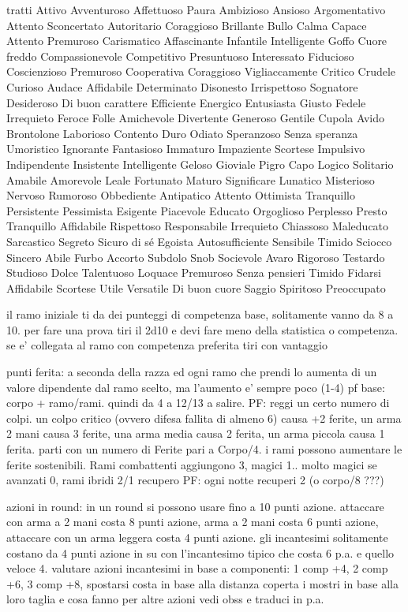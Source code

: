 \documentclass[12pt,a4paper,twoside,openany,twocolumn]{book}
\begin{document}
tratti
Attivo
Avventuroso
Affettuoso
Paura
Ambizioso
Ansioso
Argomentativo
Attento
Sconcertato
Autoritario
Coraggioso
Brillante
Bullo
Calma
Capace
Attento
Premuroso
Carismatico
Affascinante
Infantile
Intelligente
Goffo
Cuore freddo
Compassionevole
Competitivo
Presuntuoso
Interessato
Fiducioso
Coscienzioso
Premuroso
Cooperativa
Coraggioso
Vigliaccamente
Critico
Crudele
Curioso
Audace
Affidabile
Determinato
Disonesto
Irrispettoso
Sognatore
Desideroso
Di buon carattere
Efficiente
Energico
Entusiasta
Giusto
Fedele
Irrequieto
Feroce
Folle
Amichevole
Divertente
Generoso
Gentile
Cupola
Avido
Brontolone
Laborioso
Contento
Duro
Odiato
Speranzoso
Senza speranza
Umoristico
Ignorante
Fantasioso
Immaturo
Impaziente
Scortese
Impulsivo
Indipendente
Insistente
Intelligente
Geloso
Gioviale
Pigro
Capo
Logico
Solitario
Amabile
Amorevole
Leale
Fortunato
Maturo
Significare
Lunatico
Misterioso
Nervoso
Rumoroso
Obbediente
Antipatico
Attento
Ottimista
Tranquillo
Persistente
Pessimista
Esigente
Piacevole
Educato
Orgoglioso
Perplesso
Presto
Tranquillo
Affidabile
Rispettoso
Responsabile
Irrequieto
Chiassoso
Maleducato
Sarcastico
Segreto
Sicuro di sé
Egoista
Autosufficiente
Sensibile
Timido
Sciocco
Sincero
Abile
Furbo
Accorto
Subdolo
Snob
Socievole
Avaro
Rigoroso
Testardo
Studioso
Dolce
Talentuoso
Loquace
Premuroso
Senza pensieri
Timido
Fidarsi
Affidabile
Scortese
Utile
Versatile
Di buon cuore
Saggio
Spiritoso
Preoccupato


il ramo iniziale ti da dei punteggi di competenza base, solitamente vanno da 8 a 10.
per fare una prova tiri il 2d10 e devi fare meno della statistica o competenza. se e' collegata al ramo con competenza preferita tiri con vantaggio

punti ferita: a seconda della razza ed ogni ramo che prendi lo aumenta di un valore dipendente dal ramo scelto, ma l'aumento e' sempre poco (1-4)
pf base: corpo + ramo/rami. quindi da 4 a 12/13 a salire. 
PF:  reggi un certo numero di colpi. un colpo critico (ovvero difesa fallita di almeno 6) causa +2 ferite, un arma 2 mani causa 3 ferite, una arma media causa 2 ferita, un arma piccola causa 1 ferita.
parti con un numero di Ferite pari a Corpo/4. i rami possono aumentare le ferite sostenibili. 
Rami combattenti aggiungono 3, magici 1.. molto magici se avanzati 0, rami ibridi 2/1
recupero PF: ogni notte recuperi 2 (o corpo/8 ???)

azioni in round: in un round si possono usare fino a 10 punti azione. attaccare con arma a 2 mani costa 8 punti azione, arma a 2 mani costa 6 punti azione, attaccare con un arma leggera costa 4 punti azione. gli incantesimi solitamente costano da 4 punti azione in su con l'incantesimo tipico che costa 6 p.a. e quello veloce 4. valutare azioni incantesimi in base a componenti: 1 comp +4, 2 comp +6, 3 comp +8, spostarsi costa in base alla distanza coperta
i mostri in base alla loro taglia e cosa fanno
per altre azioni vedi obss e traduci in p.a.
\end{document}
